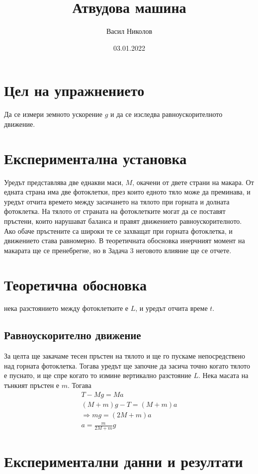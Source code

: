 \documentclass[aps, prb, twocolumn, a4paper, floatfix, reprint]{revtex4-2}
\begin{document}
\title{Атвудова машина}
\author{Васил Николов}
\noaffiliation
\date{03.01.2022}
\maketitle

\section{Цел на упражнението}
Да се измери земното ускорение $g$ и да се изследва равноускорителното движение. 

\section{Експериментална установка}
Уредът представлява две еднакви маси, $M$, окачени от двете страни на макара. От едната страна има две фотоклетки, през които едното тяло може да преминава, и уредът отчита времето между засичането на тялото при горната и долната фотоклетка. На тялото от страната на фотоклетките могат да се поставят пръстени, които нарушават баланса и правят движението равноускорителното. Ако обаче пръстените са широки те се захващат при горната фотоклетка, и движението става равномерно. В теоретичната обосновка инерчният момент на макарата ще се пренебрегне, но в Задача 3 неговото влияние ще се отчете. 

\section{Теоретична обосновка}
нека разстоянието между фотоклетките е $L$, и уредът отчита време $t$. 
\subsection{Равноускорително движение}
За целта ще закачаме тесен пръстен на тялото и ще го пускаме непосредствено над горната фотоклетка. Тогава уредът ще започне да засича точно когато тялото е пуснато, и ще спре когато то измине вертикално разстояние $L$. Нека масата на тънкият пръстен е $m$. Тогава
\begin{gather*}
    T - Mg = Ma \\
    (M + m)g - T = (M+m)a\\
    \Rightarrow mg = (2M + m)a \\
    a = \frac{m}{2M + m}g \label{eq:1} \tag{1}
\end{gather*}

\section{Експериментални данни и резултати}
\end{document}
